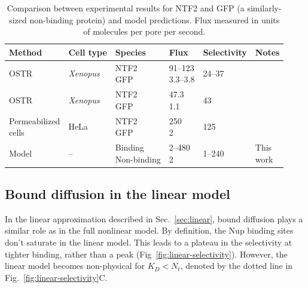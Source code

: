 \begin{table}[b!]
  \caption[Comparison between flux measurements and model predictions.]{Comparison between experimental results for NTF2 and GFP
    (a similarly-sized non-binding protein) and model
    predictions. Flux measured in units of molecules per pore per
    second.}
    \label{table:NTF2-flux}
    \begin{tabular}{p{2.1cm}p{1.2cm}p{1.7cm}p{0.9cm}p{1.6cm}p{0.8cm}}
      Method & Cell type & Species & Flux & Selectivity & Notes\\
      \hline
      OSTR & \textit{Xenopus} & \makecell[cl]{NTF2\\GFP} & \makecell[cl]{91--123\\3.3--3.8} & 24--37 
                         &\cite{siebrasse02}
      \\
      OSTR & \textit{Xenopus} & \makecell[cl]{NTF2\\GFP} & \makecell[cl]{47.3\\1.1} & 43 &  \cite{kiskin03}\\
      \makecell[cl]{Permeabilized \\ cells}  & HeLa &
                                                    \makecell[cl]{NTF2\\GFP} & \makecell[cl]{250\\2} & 125 & \cite{ribbeck01}\\
      Model & -- & \makecell[cl]{Binding\\Non-binding} & \makecell[cl]{2--480\\2} & 1--240 & \makecell[cl]{This\\work}\\
    \end{tabular}
\end{table}

\subsection{Bound diffusion in the linear model}

In the linear approximation described in Sec.~\ref{sec:linear}, bound diffusion plays a similar role as in the full nonlinear model.  By definition, the Nup binding sites don't saturate in the linear model.  This leads to a plateau in the selectivity at tighter binding, rather than a peak (Fig~\ref{fig:linear-selectivity}).  However, the linear model becomes non-physical for $K_D < N_t$, denoted by the dotted line in Fig.~\ref{fig:linear-selectivity}C.

